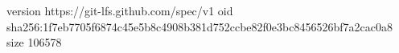 version https://git-lfs.github.com/spec/v1
oid sha256:1f7eb7705f6874c45e5b8c4908b381d752ccbe82f0e3bc8456526bf7a2cac0a8
size 106578
